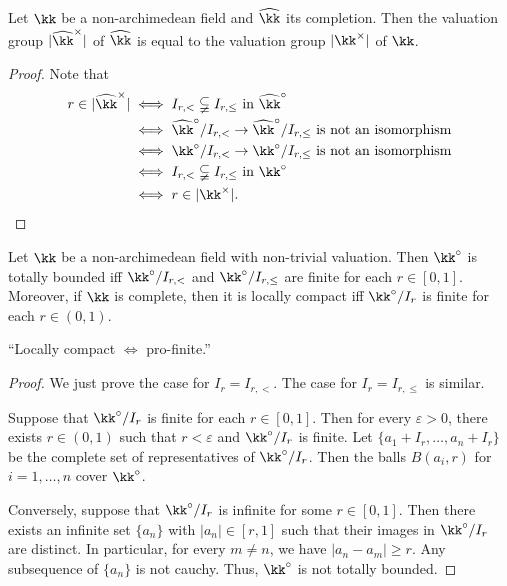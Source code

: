     \begin{corollary}\label{prop:valuation_group_of_completion_is_equal_to_the_original_fields}
        Let \(\kk\) be a non-archimedean field and \(\widehat{\kk}\) its completion.
        Then the valuation group \(|\widehat{\kk}^\times|\) of \(\widehat{\kk}\) is equal to the valuation group \(|\kk^\times|\) of \(\kk\).
    \end{corollary}
    \begin{proof}
        Note that 
        \begin{align*}
            r \in |\widehat{\kk}^\times| &\iff I_{r,<} \subsetneqq I_{r,\leq} \text{ in } \widehat{\kk}^\circ \\
            &\iff \widehat{\kk}^\circ / I_{r,<} \to \widehat{\kk}^\circ / I_{r,\leq} \text{ is not an isomorphism} \\
            &\iff \kk^\circ / I_{r,<} \to \kk^\circ / I_{r,\leq} \text{ is not an isomorphism} \\
            &\iff I_{r,<} \subsetneqq I_{r,\leq} \text{ in } \kk^\circ \\
            &\iff r \in |\kk^\times|.
        \end{align*}
    \end{proof}

    \begin{proposition}\label{prop:locally_compact_NA_field_iff_it_is_pro-finite}
        Let \(\kk\) be a non-archimedean field with non-trivial valuation.
        Then \(\kk^\circ\) is totally bounded iff \(\kk^\circ / I_{r,<}\) and \(\kk^\circ / I_{r,\leq}\) are finite for each \(r \in [0,1]\).
        Moreover, if \(\kk\) is complete, then it is locally compact iff \(\kk^\circ/I_r\) is finite for each \(r \in (0,1)\).
    \end{proposition}
    \begin{slogan}
        ``Locally compact \(\iff\) pro-finite.''
    \end{slogan}
    \begin{proof}
        We just prove the case for \(I_r = I_{r,<}\). 
        The case for \(I_r = I_{r,\leq}\) is similar.

        Suppose that \(\kk^\circ / I_r\) is finite for each \(r \in [0,1]\).
        Then for every \(\varepsilon > 0\), there exists \(r \in (0,1)\) such that \(r < \varepsilon\) and \(\kk^\circ / I_r\) is finite.
        Let \(\{a_1 + I_r, \ldots, a_n + I_r\}\) be the complete set of representatives of \(\kk^\circ / I_r\).
        Then the balls \(B(a_i,r)\) for \(i=1,\ldots,n\) cover \(\kk^\circ\).

        Conversely, suppose that \(\kk^\circ/I_r\) is infinite for some \(r \in [0,1]\).
        Then there exists an infinite set \(\{a_n\}\) with \(|a_n| \in [r,1]\) such that their images in \(\kk^\circ / I_r\) are distinct.
        In particular, for every \(m \neq n\), we have \(|a_n - a_m| \geq r\).
        Any subsequence of \(\{a_n\}\) is not cauchy.
        Thus, \(\kk^\circ\) is not totally bounded.
    \end{proof}

